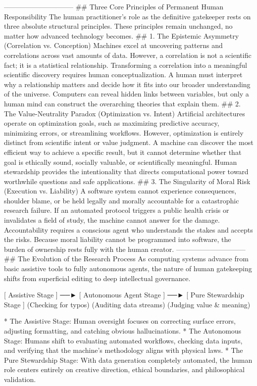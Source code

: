 ------------------------------
## Three Core Principles of Permanent Human Responsibility
The human practitioner’s role as the definitive gatekeeper rests on three absolute structural principles. These principles remain unchanged, no matter how advanced technology becomes.
## 1. The Epistemic Asymmetry (Correlation vs. Conception)
Machines excel at uncovering patterns and correlations across vast amounts of data. However, a correlation is not a scientific fact; it is a statistical relationship.
Transforming a correlation into a meaningful scientific discovery requires human conceptualization. A human must interpret why a relationship matters and decide how it fits into our broader understanding of the universe.
Computers can reveal hidden links between variables, but only a human mind can construct the overarching theories that explain them.
## 2. The Value-Neutrality Paradox (Optimization vs. Intent)
Artificial architectures operate on optimization goals, such as maximizing predictive accuracy, minimizing errors, or streamlining workflows. However, optimization is entirely distinct from scientific intent or value judgment.
A machine can discover the most efficient way to achieve a specific result, but it cannot determine whether that goal is ethically sound, socially valuable, or scientifically meaningful.
Human stewardship provides the intentionality that directs computational power toward worthwhile questions and safe applications.
## 3. The Singularity of Moral Risk (Execution vs. Liability)
A software system cannot experience consequences, shoulder blame, or be held legally and morally accountable for a catastrophic research failure. If an automated protocol triggers a public health crisis or invalidates a field of study, the machine cannot answer for the damage.
Accountability requires a conscious agent who understands the stakes and accepts the risks. Because moral liability cannot be programmed into software, the burden of ownership rests fully with the human creator.
------------------------------
## The Evolution of the Research Process
As computing systems advance from basic assistive tools to fully autonomous agents, the nature of human gatekeeping shifts from superficial editing to deep intellectual governance.

[ Assistive Stage ] ──► [ Autonomous Agent Stage ] ──► [ Pure Stewardship Stage ]
(Checking for typos)     (Auditing data streams)        (Judging value & meaning)


* The Assistive Stage: Human oversight focuses on correcting surface errors, adjusting formatting, and catching obvious hallucinations.
* The Autonomous Stage: Humans shift to evaluating automated workflows, checking data inputs, and verifying that the machine's methodology aligns with physical laws.
* The Pure Stewardship Stage: With data generation completely automated, the human role centers entirely on creative direction, ethical boundaries, and philosophical validation.

